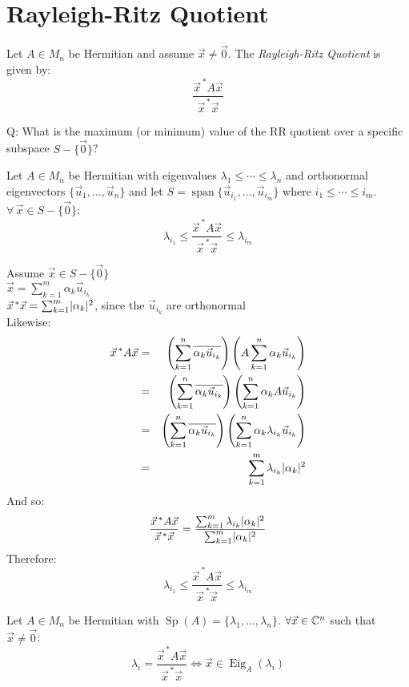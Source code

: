 \documentclass[letterpaper,12pt,fleqn]{article}
\newcommand{\vx}{\vec{x}}
\newcommand{\vxct}{\vx^{\,*}}
\newcommand{\vz}{\vec{0}}
\newcommand{\vu}{\vec{u}}
\renewcommand{\ss}{S-\{\vz\}}
\renewcommand{\a}{\alpha}
\renewcommand{\l}{\lambda}
\newcommand{\rr}{\frac{\vxct A\vx}{\vxct\vx}}
\newcommand{\conj}[1]{\overline{#1}}
\DeclareMathOperator{\spn}{span}
\DeclareMathOperator{\Eig}{Eig}
\DeclareMathOperator{\Sp}{Sp}
\begin{document}
\section*{Rayleigh-Ritz Quotient}

\begin{definition}
  Let $A\in M_n$ be Hermitian and assume $\vx\ne\vz$. The
  \emph{Rayleigh-Ritz Quotient} is given by:
  \[\rr\]
\end{definition}

Q: What is the maximum (or minimum) value of the RR quotient over a specific
subspace $\ss$?

\begin{lemma}
  Let $A\in M_n$ be Hermitian with eigenvalues $\l_1\le\cdots\le\l_n$ and
  orthonormal eigenvectors $\{\vu_1,\ldots,\vu_n\}$ and let
  $S=\spn\{\vu_{i_1},\ldots,\vu_{i_m}\}$ where $i_1\le\cdots\le i_m$.
  $\forall\,\vx\in\ss$:
  \[\l_{i_1}\le\rr\le\l_{i_m}\]
\end{lemma}

\begin{theproof}
  Assume $\vx\in\ss$ \\
  $\vx=\sum_{k=1}^m\a_k\vu_{i_k}$ \\
  $\vxct\vx=\sum_{k=1}^m\abs{\a_k}^2$, since the $\vu_{i_k}$ are orthonormal \\
  Likewise:
  \begin{eqnarray*}
    \vxct A\vx &=&
    \left(\sum_{k=1}^n\conj{\a_k\vu_{i_k}}\right)
    \left(A\sum_{k=1}^n\a_k\vu_{i_k}\right) \\
    &=& \left(\sum_{k=1}^n\conj{\a_k\vu_{i_k}}\right)
    \left(\sum_{k=1}^n\a_kA\vu_{i_k}\right) \\
    &=& \left(\sum_{k=1}^n\conj{\a_k\vu_{i_k}}\right)
    \left(\sum_{k=1}^n\a_k\l_{i_k}\vu_{i_k}\right) \\
    &=& \sum_{k=1}^m\l_{i_k}\abs{\a_k}^2
  \end{eqnarray*}
  And so:
  \[\rr=\frac{\sum_{k=1}^m\l_{i_k}\abs{\a_k}^2}{\sum_{k=1}^m\abs{\a_k}^2}\]
  Therefore:
  \[\l_{i_1}\le\rr\le\l_{i_m}\]
\end{theproof}
\newpage
\begin{lemma}
  Let $A\in M_n$ be Hermitian with $\Sp(A)=\{\l_1,\ldots,\l_n\}$.
  $\forall\vx\in\C^n$ such that $\vx\ne\vz$:
  \[\l_i=\rr\iff\vx\in\Eig_A(\l_i)\]
\end{lemma}
\end{document}

